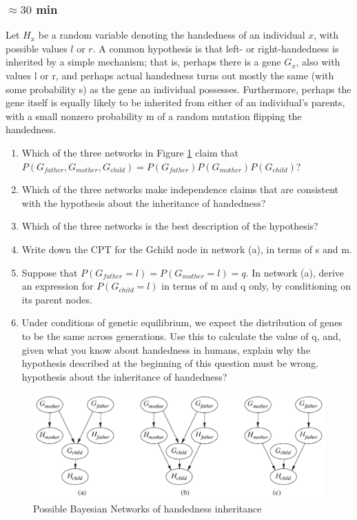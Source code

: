 \documentclass[a4paper, 10pt]{article}
\begin{document}
\subsubsection{$\approx 30$ min}
Let $H_x$ be a random variable denoting the handedness of an individual $x$, with possible
values $l$ or $r$. A common hypothesis is that left- or right-handedness is inherited by a simple
mechanism; that is, perhaps there is a gene $G_x$, also with values l or r, and perhaps actual
handedness turns out mostly the same (with some probability s) as the gene an individual
possesses. Furthermore, perhaps the gene itself is equally likely to be inherited from either
of an individual’s parents, with a small nonzero probability m of a random mutation flipping
the handedness.
\begin{enumerate}
    \item Which of the three networks in Figure \ref{fig:b_net} claim that\\ $P(G_{father},G_{mother},G_{child}) =
P(G_{father} )P(G_{mother} )P(G_{child} )$?
    \item Which of the three networks make independence claims that are consistent with the
hypothesis about the inheritance of handedness?
    \item Which of the three networks is the best description of the hypothesis?
    \item Write down the CPT for the Gchild node in network (a), in terms of s and m.
    \item Suppose that $P(G_{father} =l) = P(G_{mother} =l) = q$. In network (a), derive an expression
for $P(G_{child} =l)$ in terms of m and q only, by conditioning on its parent nodes.
    \item Under conditions of genetic equilibrium, we expect the distribution of genes to be the
same across generations. Use this to calculate the value of q, and, given what you know
about handedness in humans, explain why the hypothesis described at the beginning of
this question must be wrong.
hypothesis about the inheritance of handedness?
\end{enumerate}
\begin{figure}[H]
    \centering
    \includegraphics[width=1.\textwidth]{figures/bnet.png}
    \caption{Possible Bayesian Networks of handedness inheritance}
    \label{fig:b_net}
\end{figure}
\end{document}
